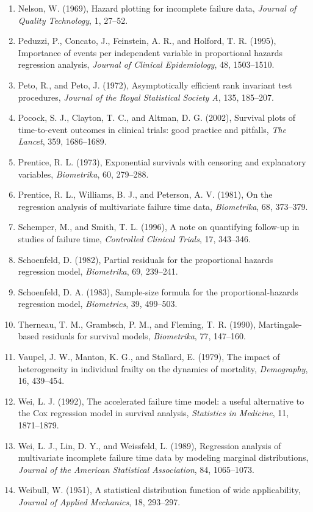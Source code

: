 \documentclass[11pt,a4paper]{article}
\numberwithin{equation}{section}
\theoremstyle{definition}
\begin{document}
\begin{enumerate}
\item Nelson, W. (1969), Hazard plotting for incomplete failure data, \emph{Journal of Quality Technology}, 1, 27--52.
\item Peduzzi, P., Concato, J., Feinstein, A. R., and Holford, T. R. (1995), Importance of events per independent variable in proportional hazards regression analysis, \emph{Journal of Clinical Epidemiology}, 48, 1503--1510.
\item Peto, R., and Peto, J. (1972), Asymptotically efficient rank invariant test procedures, \emph{Journal of the Royal Statistical Society A}, 135, 185--207.
\item Pocock, S. J., Clayton, T. C., and Altman, D. G. (2002), Survival plots of time-to-event outcomes in clinical trials: good practice and pitfalls, \emph{The Lancet}, 359, 1686--1689.
\item Prentice, R. L. (1973), Exponential survivals with censoring and explanatory variables, \emph{Biometrika}, 60, 279--288.
\item Prentice, R. L., Williams, B. J., and Peterson, A. V. (1981), On the regression analysis of multivariate failure time data, \emph{Biometrika}, 68, 373--379.
\item Schemper, M., and Smith, T. L. (1996), A note on quantifying follow-up in studies of failure time, \emph{Controlled Clinical Trials}, 17, 343--346.
\item Schoenfeld, D. (1982), Partial residuals for the proportional hazards regression model, \emph{Biometrika}, 69, 239--241.
\item Schoenfeld, D. A. (1983), Sample-size formula for the proportional-hazards regression model, \emph{Biometrics}, 39, 499--503.
\item Therneau, T. M., Grambsch, P. M., and Fleming, T. R. (1990), Martingale-based residuals for survival models, \emph{Biometrika}, 77, 147--160.
\item Vaupel, J. W., Manton, K. G., and Stallard, E. (1979), The impact of heterogeneity in individual frailty on the dynamics of mortality, \emph{Demography}, 16, 439--454.
\item Wei, L. J. (1992), The accelerated failure time model: a useful alternative to the Cox regression model in survival analysis, \emph{Statistics in Medicine}, 11, 1871--1879.
\item Wei, L. J., Lin, D. Y., and Weissfeld, L. (1989), Regression analysis of multivariate incomplete failure time data by modeling marginal distributions, \emph{Journal of the American Statistical Association}, 84, 1065--1073.
\item Weibull, W. (1951), A statistical distribution function of wide applicability, \emph{Journal of Applied Mechanics}, 18, 293--297.
\end{enumerate}
\end{document}
